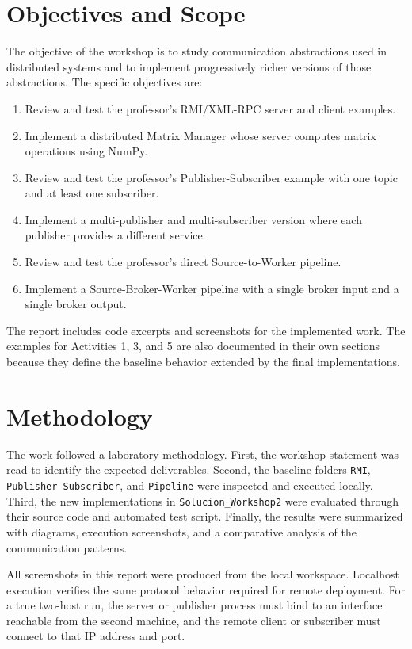 \documentclass[11pt,a4paper]{article}
\newcommand{\code}[1]{\texttt{#1}}
\begin{document}
\section*{Objectives and Scope}

The objective of the workshop is to study communication abstractions used in
distributed systems and to implement progressively richer versions of those
abstractions. The specific objectives are:

\begin{enumerate}
    \item Review and test the professor's RMI/XML-RPC server and client examples.
    \item Implement a distributed Matrix Manager whose server computes matrix
    operations using NumPy.
    \item Review and test the professor's Publisher-Subscriber example with one
    topic and at least one subscriber.
    \item Implement a multi-publisher and multi-subscriber version where each
    publisher provides a different service.
    \item Review and test the professor's direct Source-to-Worker pipeline.
    \item Implement a Source-Broker-Worker pipeline with a single broker input
    and a single broker output.
\end{enumerate}

The report includes code excerpts and screenshots for the implemented work. The
examples for Activities 1, 3, and 5 are also documented in their own sections
because they define the baseline behavior extended by the final implementations.

\section*{Methodology}

The work followed a laboratory methodology. First, the workshop statement was
read to identify the expected deliverables. Second, the baseline folders
\code{RMI}, \code{Publisher-Subscriber}, and \code{Pipeline} were inspected and
executed locally. Third, the new implementations in \code{Solucion\_Workshop2}
were evaluated through their source code and automated test script. Finally, the
results were summarized with diagrams, execution screenshots, and a comparative
analysis of the communication patterns.

All screenshots in this report were produced from the local workspace. Localhost
execution verifies the same protocol behavior required for remote deployment.
For a true two-host run, the server or publisher process must bind to an
interface reachable from the second machine, and the remote client or subscriber
must connect to that IP address and port.
\end{document}
